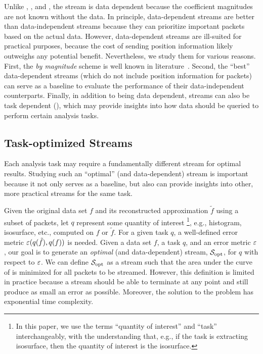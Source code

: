 Unlike \slvl, \sbit, and \swav, the \smag stream is data dependent because the coefficient
magnitudes are not known without the data.
%
In principle, data-dependent streams are better than data-independent streams because they can
prioritize important packets based on the actual data. However, data-dependent streams are
ill-suited for practical purposes, because the cost of sending position information likely outweighs
any potential benefit. Nevertheless, we study them for various reasons. First, the \emph{by
magnitude} scheme is well known in literature~\cite{vapor2007}. Second, the ``best'' data-dependent
streams (which do not include position information for packets) can serve as a baseline to evaluate
the performance of their data-independent counterparts. Finally, in addition to being data
dependent, streams can also be task dependent (), which may provide
insights into how data should be queried to perform certain analysis tasks.

\subsection{Task-optimized Streams} \label{sec:data_dep_streams}

Each analysis task may require a fundamentally different stream for optimal results. Studying such
an ``optimal'' (and data-dependent) stream is important because it not only serves as a baseline,
but also can provide insights into other, more practical streams for the same task.

Given the original data set $f$ and its reconstructed approximation $\tilde{f}$ using a subset of
packets, let $q$ represent some quantity of interest \footnote{In this paper, we use the terms
``quantity of interest'' and ``task'' interchangeably, with the understanding that, e.g., if the
task is extracting isosurface, then the quantity of interest is the isosurface.}, e.g., histogram,
isosurface, etc., computed on $f$ or $\tilde{f}$. For a given task $q$, a well-defined error metric
$\err(q(\tilde{f}),q(f))$ is needed. Given a data set $f$, a task $q$, and an error metric $\err$,
our goal is to generate an \emph{optimal} (and data-dependent) stream, $\sopt$, for $q$ with respect
to $\err$. We can define $\sopt$ as a stream such that the area under the curve of \err is minimized
for all packets to be streamed. However, this definition is limited in practice because a stream
should be able to terminate at any point and still produce as small an error as possible. Moreover,
the solution to the problem has exponential time complexity.

